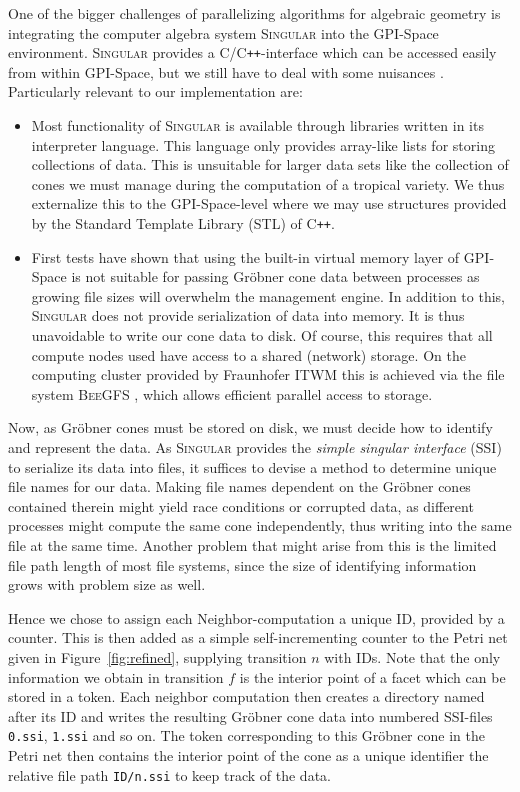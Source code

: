 \documentclass[
  paper=a4,
  titlepage,
  bibliography=totoc,
  pagesize=pdftex
]{scrartcl}
\numberwithin{figure}{section}
\numberwithin{equation}{section}
\numberwithin{table}{section}
\newcommand{\Cpp}{C\nolinebreak\texttt{++}}
\theoremstyle{definition}
\numberwithin{definition}{section}
\begin{document}
One of the bigger challenges of parallelizing algorithms for algebraic geometry is
integrating the computer algebra system \textsc{Singular} into the GPI-Space environment.
\textsc{Singular} provides a C/\Cpp-interface which can be accessed easily from within
GPI-Space, but we still have to deal with some nuisances
\cite[Section~4.2]{reinboldGitFan}. Particularly relevant to our implementation are:
\begin{itemize}
  \item Most functionality of \textsc{Singular} is available through libraries written in
    its interpreter language. This language only provides array-like lists for storing
    collections of data. This is unsuitable for larger data sets like the collection of
    cones we must manage during the computation of a tropical variety. We thus externalize
    this to the GPI-Space-level where we may use structures provided by the Standard
    Template Library (STL) of \Cpp.
  \item First tests have shown that using the built-in virtual memory layer of GPI-Space
    is not suitable for passing Gröbner cone data between processes as growing file sizes
    will overwhelm the management engine. In addition to this, \textsc{Singular} does not
    provide serialization of data into memory. It is thus unavoidable to write our cone
    data to disk. Of course, this requires that all compute nodes used have access to a
    shared (network) storage. On the computing cluster provided by Fraunhofer ITWM this is
    achieved via the file system \textsc{BeeGFS} \cite{bgfs}, which allows efficient
    parallel access to storage.
\end{itemize}

Now, as Gröbner cones must be stored on disk, we must decide how to identify and represent
the data. As \textsc{Singular} provides the \emph{simple singular interface} (SSI) to
serialize its data into files, it suffices to devise a method to determine unique file
names for our data. Making file names dependent on the Gröbner cones contained therein
might yield race conditions or corrupted data, as different processes might compute the
same cone independently, thus writing into the same file at the same time. Another problem
that might arise from this is the limited file path length of most file systems, since the
size of identifying information grows with problem size as well.

Hence we chose to assign each Neighbor-computation a unique ID, provided by a counter.
This is then added as a simple self-incrementing counter to the Petri net given in
Figure~\ref{fig:refined}, supplying transition $n$ with IDs. Note that the only
information we obtain in transition $f$ is the interior point of a facet which can be
stored in a token. Each neighbor computation then creates a directory named after its ID
and writes the resulting Gröbner cone data into numbered SSI-files \texttt{0.ssi},
\texttt{1.ssi} and so on. The token corresponding to this Gröbner cone in the Petri net
then contains the interior point of the cone as a unique identifier the relative file path
\texttt{ID/n.ssi} to keep track of the data.
\end{document}
